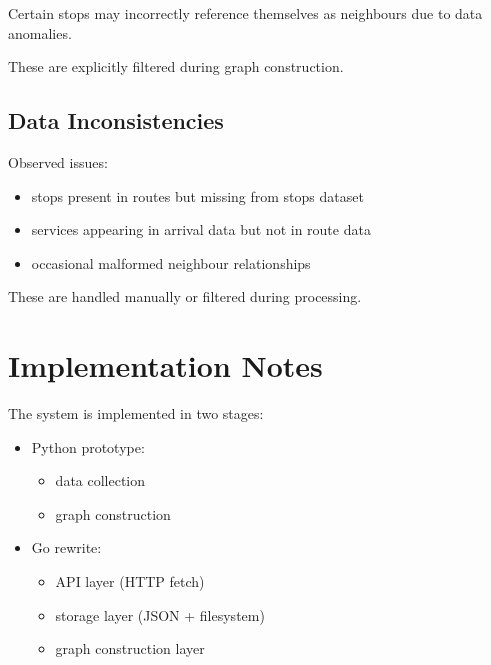 \documentclass[11pt,a4paper]{article}
\begin{document}
Certain stops may incorrectly reference themselves as neighbours due to data anomalies.

These are explicitly filtered during graph construction.

\subsection{Data Inconsistencies}

Observed issues:

\begin{itemize}
    \item stops present in routes but missing from stops dataset
    \item services appearing in arrival data but not in route data
    \item occasional malformed neighbour relationships
\end{itemize}

These are handled manually or filtered during processing.

\section{Implementation Notes}

The system is implemented in two stages:

\begin{itemize}
    \item Python prototype:
    \begin{itemize}
        \item data collection
        \item graph construction
    \end{itemize}

    \item Go rewrite:
    \begin{itemize}
        \item API layer (HTTP fetch)
        \item storage layer (JSON + filesystem)
        \item graph construction layer
    \end{itemize}
\end{itemize}
\end{document}
